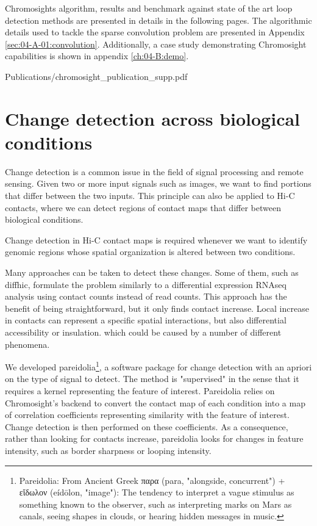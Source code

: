 Chromosights algorithm, results and benchmark against state of the art loop detection methods are presented in details in the following pages. The algorithmic details used to tackle the sparse convolution problem are presented in Appendix \ref{sec:04-A-01:convolution}. Additionally, a case study demonstrating Chromosight capabilities is shown in appendix \ref{ch:04-B:demo}.


     {Publications/chromosight_publication_supp.pdf}    

\section{Change detection across biological conditions}

Change detection is a common issue in the field of signal processing and remote sensing. Given two or more input signals such as images, we want to find portions that differ between the two inputs. This principle can also be applied to Hi-C contacts, where we can detect regions of contact maps that differ between biological conditions.

Change detection in Hi-C contact maps is required whenever we want to identify genomic regions whose spatial organization is altered between two conditions.

Many approaches can be taken to detect these changes. Some of them, such as diffhic, formulate the problem similarly to a differential expression RNAseq analysis using contact counts instead of read counts. This approach has the benefit of being straightforward, but it only finds contact increase. Local increase in contacts can represent a specific spatial interactions, but also differential accessibility or insulation. which could be caused by a number of different phenomena.

We developed pareidolia\footnote{Pareidolia: From Ancient Greek {\textgreekfont παρα} (para, "alongside, concurrent") + {\textgreekfont εἴδωλον} (eídōlon, "image"): The tendency to interpret a vague stimulus as something known to the observer, such as interpreting marks on Mars as canals, seeing shapes in clouds, or hearing hidden messages in music.}, a software package for change detection with an apriori on the type of signal to detect. The method is "supervised" in the sense that it requires a kernel representing the feature of interest. Pareidolia relies on Chromosight's backend to convert the contact map of each condition into a map of correlation coefficients representing similarity with the feature of interest. Change detection is then performed on these coefficients. As a consequence, rather than looking for contacts increase, pareidolia looks for changes in feature intensity, such as border sharpness or looping intensity.

